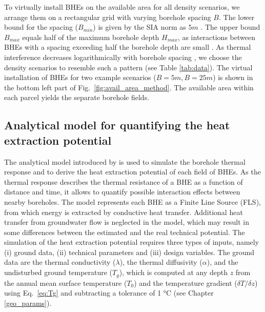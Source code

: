 To virtually install BHEs on the available area for all density scenarios, we arrange them on a rectangular grid with varying borehole spacing $B$.
The lower bound for the spacing ($B_{min}$) is given by the SIA norm as $5m$ \cite{sia_sondes_2010}.
The upper bound $B_{max}$ equals half of the maximum borehole depth $H_{max}$, as interactions between BHEs with a spacing exceeding half the borehole depth are small \cite{pahud_geothermal_2002}. 
As thermal interference decreases logarithmically with borehole spacing \cite{eskilson_thermal_1987}, we choose the density scenarios to resemble such a pattern (see Table \ref{tab:data}).
The virtual installation of BHEs for two example scenarios ($B = 5m, B = 25m$) is shown in the bottom left part of Fig.~\ref{fig:avail_area_method}. 
The available area within each parcel yields the separate borehole fields.

\subsection{Analytical model for quantifying the heat extraction potential}
\label{model}

The analytical model introduced by \citet{eskilson_thermal_1987} is used to simulate the borehole thermal response and to derive the heat extraction potential of each field of BHEs.
As the thermal response describes the thermal resistance of a BHE as a function of distance and time, it allows to quantify possible interaction effects between nearby boreholes.
The model represents each BHE as a Finite Line Source (FLS), from which energy is extracted by conductive heat transfer.
Additional heat transfer from groundwater flow is neglected in the model, which may result in some differences between the estimated and the real technical potential.
The simulation of the heat extraction potential requires three types of inputs, namely (i) ground data, (ii) technical parameters and (iii) design variables.
The ground data 
are the thermal conductivity ($\lambda$), the thermal diffusivity ($\alpha$), and the undisturbed ground temperature ($T_g$), which is computed at any depth $z$ from the annual mean surface temperature ($T_0$) and the temperature gradient ($\delta T/\delta z$) using Eq.~\ref{eq:Tg} and subtracting a tolerance of 1 °C (see Chapter \ref{geo_params}).

